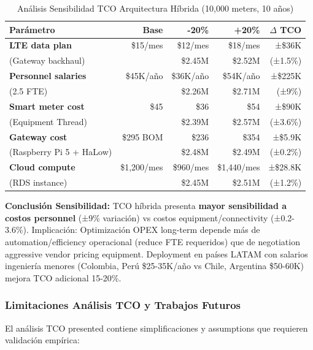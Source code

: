 \begin{table}[H]
\centering
\caption{Análisis Sensibilidad TCO Arquitectura Híbrida (10,000 meters, 10 años)}
\label{tab:tco-sensitivity}
\small
\begin{tabular}{|p{4cm}|r|r|r|r|}
\hline
\rowcolor{gray!30}
\textbf{Parámetro} & \textbf{Base} & \textbf{-20\%} & \textbf{+20\%} & \textbf{$\Delta$ TCO} \\
\hline
\textbf{LTE data plan} & \$15/mes & \$12/mes & \$18/mes & ±\$36K \\
(Gateway backhaul) & & \$2.45M & \$2.52M & (±1.5\%) \\
\hline
\textbf{Personnel salaries} & \$45K/año & \$36K/año & \$54K/año & ±\$225K \\
(2.5 FTE) & & \$2.26M & \$2.71M & (±9\%) \\
\hline
\textbf{Smart meter cost} & \$45 & \$36 & \$54 & ±\$90K \\
(Equipment Thread) & & \$2.39M & \$2.57M & (±3.6\%) \\
\hline
\textbf{Gateway cost} & \$295 BOM & \$236 & \$354 & ±\$5.9K \\
(Raspberry Pi 5 + HaLow) & & \$2.48M & \$2.49M & (±0.2\%) \\
\hline
\textbf{Cloud compute} & \$1,200/mes & \$960/mes & \$1,440/mes & ±\$28.8K \\
(RDS instance) & & \$2.45M & \$2.51M & (±1.2\%) \\
\hline
\end{tabular}
\end{table}

\textbf{Conclusión Sensibilidad:} TCO híbrida presenta \textbf{mayor sensibilidad a costos personnel} (±9\% variación) vs costos equipment/connectivity (±0.2-3.6\%). Implicación: Optimización OPEX long-term depende más de automation/efficiency operacional (reduce FTE requeridos) que de negotiation aggressive vendor pricing equipment. Deployment en países LATAM con salarios ingeniería menores (Colombia, Perú \$25-35K/año vs Chile, Argentina \$50-60K) mejora TCO adicional 15-20\%.

\subsubsection{Limitaciones Análisis TCO y Trabajos Futuros}

El análisis TCO presented contiene simplificaciones y assumptions que requieren validación empírica:

